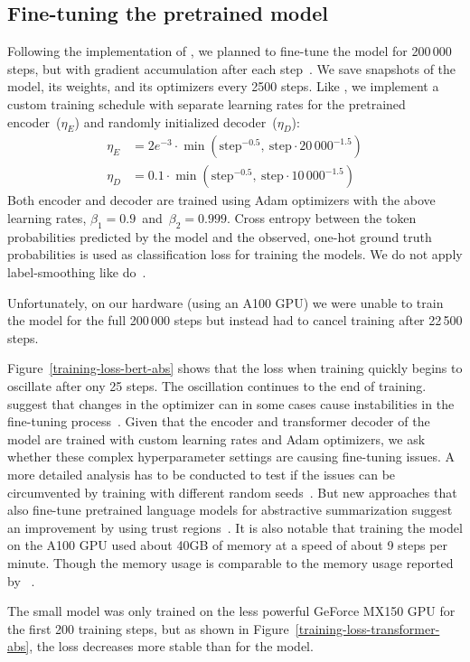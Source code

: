 \subsection{Fine-tuning the pretrained model}

Following the implementation of \cite{LiuL2019}, we planned to fine-tune the \BertSumAbs model for 200\,000 steps, but with gradient accumulation after each step~\cite{LiuL2019}. We save snapshots of the model, its weights, and its optimizers every 2500 steps.
Like \citeauthor{LiuL2019}, we implement a custom training schedule with separate learning rates for the pretrained encoder~(\(\eta_E\)) and randomly initialized decoder~(\(\eta_D\)):
\begin{align*}
    \eta_E &= 2e^{-3} \cdot \min( \text{step}^{-0.5},\ \text{step} \cdot 20\,000^{-1.5} ) \\
    \eta_D &= 0.1 \cdot \min( \text{step}^{-0.5},\ \text{step} \cdot 10\,000^{-1.5} )
\end{align*}
Both encoder and decoder are trained using Adam optimizers with the above learning rates, \(\beta_1 = 0.9\)~and~\(\beta_2 = 0.999\).
Cross entropy between the token probabilities predicted by the model and the observed, one-hot ground truth probabilities is used as classification loss for training the models. We do not apply label-smoothing like \citeauthor{LiuL2019} do~\cite{LiuL2019}.

Unfortunately, on our hardware (using an A100 GPU) we were unable to train the model for the full 200\,000 steps but instead had to cancel training after 22\,500 steps.

Figure~\ref{training-loss-bert-abs} shows that the loss when training \BertSumAbs quickly begins to oscillate after ony 25 steps. The oscillation continues to the end of training.
\citeauthor{ZhangWKWA2020} suggest that changes in the optimizer can in some cases cause instabilities in the fine-tuning process~\cite{ZhangWKWA2020}.
Given that the \Bert encoder and transformer decoder of the \BertSumAbs model are trained with custom learning rates and Adam optimizers, we ask whether these complex hyperparameter settings are causing fine-tuning issues.
A more detailed analysis has to be conducted to test if the issues can be circumvented by training with different random seeds~\cite{DodgeISFHS2020}.
But new approaches that also fine-tune pretrained language models for abstractive summarization suggest an improvement by using trust regions~\cite{AghajanyanSGGZG2020}.
It is also notable that training the \BertSumAbs model on the A100 GPU used about 40GB of memory at a speed of about 9 steps per minute.
Though the memory usage is comparable to the memory usage reported by \citeauthor{LiuL2019}~\cite{LiuL2019}.

The small \TransformerAbsTiny model was only trained on the less powerful GeForce MX150 GPU for the first 200 training steps, but as shown in Figure~\ref{training-loss-transformer-abs}, the loss decreases more stable than for the \BertSumAbs model.

